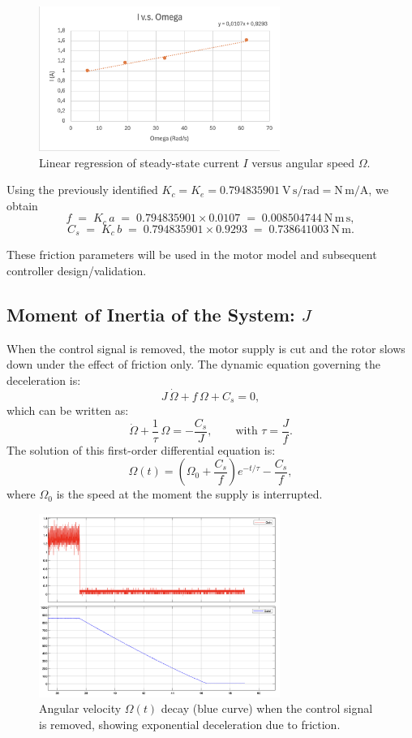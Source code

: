 \documentclass{rapportCS}
\begin{document}
\begin{figure}[H]
\centering
\includegraphics[width=0.7\textwidth]{figures/graph_i_omega.png}
\caption{Linear regression of steady-state current $I$ versus angular speed $\Omega$.}
\label{fig:i_omega}
\end{figure}

Using the previously identified $K_c = K_e = 0.794835901~\mathrm{V\,s/rad} = \mathrm{N\,m/A}$, we obtain
\[
f \;=\; K_c\,a \;=\; 0.794835901 \times 0.0107 \;=\; \mathbf{0.008504744}~\mathrm{N\,m\,s},
\]
\[
C_s \;=\; K_c\,b \;=\; 0.794835901 \times 0.9293 \;=\; \mathbf{0.738641003}~\mathrm{N\,m}.
\]

These friction parameters will be used in the motor model and subsequent controller design/validation.

\subsection{Moment of Inertia of the System: $J$}

When the control signal is removed, the motor supply is cut and the rotor slows down under the effect of friction only. The dynamic equation governing the deceleration is:
\[
J\,\dot{\Omega} + f\,\Omega + C_s = 0,
\]
which can be written as:
\[
\dot{\Omega} + \frac{1}{\tau}\,\Omega = -\frac{C_s}{J}, \qquad \text{with } \tau = \frac{J}{f}.
\]
The solution of this first-order differential equation is:
\[
\Omega(t) = \left(\Omega_0 + \frac{C_s}{f}\right)e^{-t/\tau} - \frac{C_s}{f},
\]
where $\Omega_0$ is the speed at the moment the supply is interrupted.

\begin{figure}[H]
\centering
\includegraphics[width=0.7\textwidth]{figures/signal_removed.png}
\caption{Angular velocity $\Omega(t)$ decay (blue curve) when the control signal is removed, showing exponential deceleration due to friction.}
\label{fig:J_measurement}
\end{figure}
\end{document}
